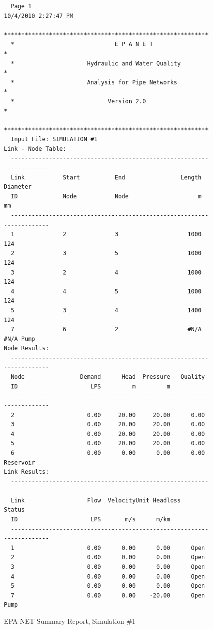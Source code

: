 \documentclass[11pt]{article}
\begin{document}
\begin{enumerate}
\begin{figure}[ht!]
\begin{verbatim}
  Page 1                                            10/4/2010 2:27:47 PM
  **********************************************************************
  *                             E P A N E T                            *
  *                     Hydraulic and Water Quality                    *
  *                     Analysis for Pipe Networks                     *
  *                           Version 2.0                              *
  **********************************************************************
  Input File: SIMULATION #1
Link - Node Table:
  ----------------------------------------------------------------------
  Link           Start          End                Length  Diameter
  ID             Node           Node                    m        mm
  ----------------------------------------------------------------------
  1              2              3                    1000       124
  2              3              5                    1000       124
  3              2              4                    1000       124
  4              4              5                    1000       124
  5              3              4                    1400       124
  7              6              2                    #N/A      #N/A Pump
Node Results:
  ----------------------------------------------------------------------
  Node                Demand      Head  Pressure   Quality
  ID                     LPS         m         m          
  ----------------------------------------------------------------------
  2                     0.00     20.00     20.00      0.00
  3                     0.00     20.00     20.00      0.00
  4                     0.00     20.00     20.00      0.00
  5                     0.00     20.00     20.00      0.00
  6                     0.00      0.00      0.00      0.00 Reservoir
Link Results:
  ----------------------------------------------------------------------
  Link                  Flow  VelocityUnit Headloss    Status
  ID                     LPS       m/s      m/km
  ----------------------------------------------------------------------
  1                     0.00      0.00      0.00      Open
  2                     0.00      0.00      0.00      Open
  3                     0.00      0.00      0.00      Open
  4                     0.00      0.00      0.00      Open
  5                     0.00      0.00      0.00      Open
  7                     0.00      0.00    -20.00      Open Pump
  \end{verbatim}
     \caption{EPA-NET Summary Report, Simulation \#1}
   \label{fig:epanet1} 
\end{figure}



\end{enumerate}
\end{document}

